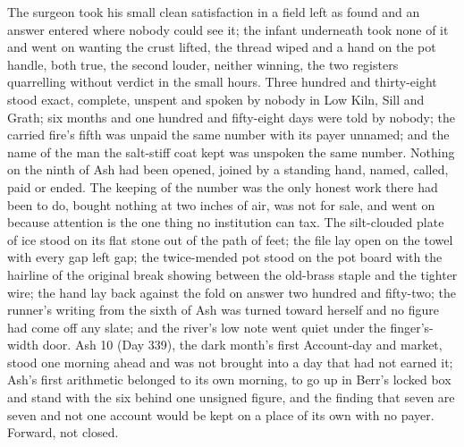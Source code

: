 The surgeon took his small clean satisfaction in a field left as found and an answer entered where nobody could see it; the infant underneath took none of it and went on wanting the crust lifted, the thread wiped and a hand on the pot handle, both true, the second louder, neither winning, the two registers quarrelling without verdict in the small hours. Three hundred and thirty-eight stood exact, complete, unspent and spoken by nobody in Low Kiln, Sill and Grath; six months and one hundred and fifty-eight days were told by nobody; the carried fire's fifth was unpaid the same number with its payer unnamed; and the name of the man the salt-stiff coat kept was unspoken the same number. Nothing on the ninth of Ash had been opened, joined by a standing hand, named, called, paid or ended. The keeping of the number was the only honest work there had been to do, bought nothing at two inches of air, was not for sale, and went on because attention is the one thing no institution can tax. The silt-clouded plate of ice stood on its flat stone out of the path of feet; the file lay open on the towel with every gap left gap; the twice-mended pot stood on the pot board with the hairline of the original break showing between the old-brass staple and the tighter wire; the hand lay back against the fold on answer two hundred and fifty-two; the runner's writing from the sixth of Ash was turned toward herself and no figure had come off any slate; and the river's low note went quiet under the finger's-width door. Ash 10 (Day 339), the dark month's first Account-day and market, stood one morning ahead and was not brought into a day that had not earned it; Ash's first arithmetic belonged to its own morning, to go up in Berr's locked box and stand with the six behind one unsigned figure, and the finding that seven are seven and not one account would be kept on a place of its own with no payer. Forward, not closed.
